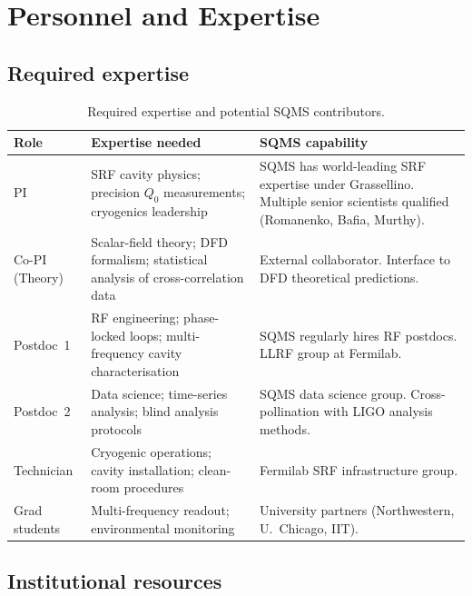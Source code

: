 \documentclass[11pt]{article}
\begin{document}
\section{Personnel and Expertise}
\label{sec:personnel}

\subsection{Required expertise}

\begin{table}[H]
\centering
\caption{Required expertise and potential SQMS contributors.}
\label{tab:personnel}
\renewcommand{\arraystretch}{1.2}
\begin{tabular}{@{}p{3cm}p{4cm}p{5.5cm}@{}}
\toprule
\textbf{Role} & \textbf{Expertise needed} & \textbf{SQMS capability} \\
\midrule
PI & SRF cavity physics; precision $Q_0$ measurements; cryogenics
  leadership &
  SQMS has world-leading SRF expertise under Grassellino. Multiple senior
  scientists qualified (Romanenko, Bafia, Murthy). \\
\midrule
Co-PI (Theory) & Scalar-field theory; DFD formalism; statistical analysis
  of cross-correlation data &
  External collaborator. Interface to DFD theoretical predictions. \\
\midrule
Postdoc~1 & RF engineering; phase-locked loops; multi-frequency cavity
  characterisation &
  SQMS regularly hires RF postdocs. LLRF group at Fermilab. \\
\midrule
Postdoc~2 & Data science; time-series analysis; blind analysis protocols &
  SQMS data science group. Cross-pollination with LIGO analysis methods. \\
\midrule
Technician & Cryogenic operations; cavity installation; clean-room
  procedures &
  Fermilab SRF infrastructure group. \\
\midrule
Grad students & Multi-frequency readout; environmental monitoring &
  University partners (Northwestern, U.\ Chicago, IIT). \\
\bottomrule
\end{tabular}
\end{table}

\subsection{Institutional resources}
\end{document}
